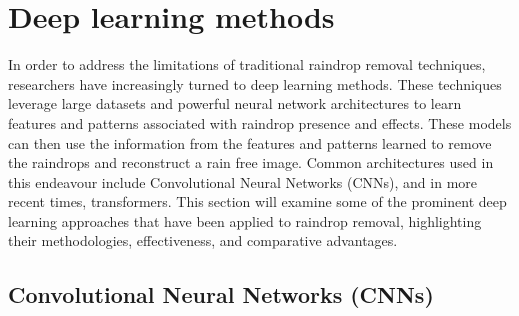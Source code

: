 \documentclass[11pt]{ociamthesis}  %
\begin{document}
\section{Deep learning methods}

In order to address the limitations of traditional raindrop removal techniques, researchers have increasingly turned to deep learning methods. These techniques leverage large datasets and powerful neural network architectures to learn features and patterns associated with raindrop presence and effects. These models can then use the information from the features and patterns learned to remove the raindrops and reconstruct a rain free image. Common architectures used in this endeavour include Convolutional Neural Networks (CNNs), and in more recent times, transformers. This section will examine some of the prominent deep learning approaches that have been applied to raindrop removal, highlighting their methodologies, effectiveness, and comparative advantages.

\subsection{Convolutional Neural Networks (CNNs)}
\end{document}
